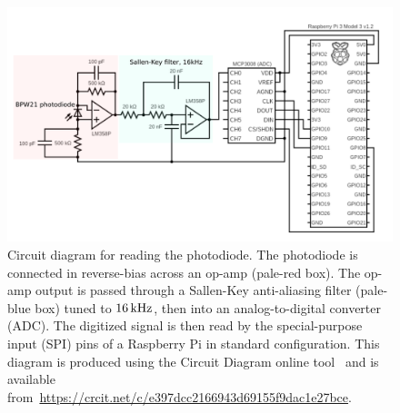 \documentclass[paper-main.tex]{subfiles}
\begin{document}
\begin{figure}
	\includegraphics[width=.8\textwidth]{figures/circuit_diagram_2.pdf}
	\caption{\label{fig:circuit_diagram}
Circuit diagram for reading the photodiode. 
The photodiode is connected in reverse-bias across an op-amp (pale-red box). 
The op-amp output is passed through a Sallen-Key anti-aliasing filter (pale-blue box) tuned to $16\,{\rm kHz}$, then into an analog-to-digital converter (ADC). 
The digitized signal is then read by the special-purpose input (SPI) pins of a Raspberry Pi in standard configuration.
This diagram is produced using the Circuit Diagram online tool~\cite{CircuitDiagram:online} and is available from~\url{https://crcit.net/c/e397dcc2166943d69155f9dac1e27bce}.
}
\end{figure}




\end{document}
